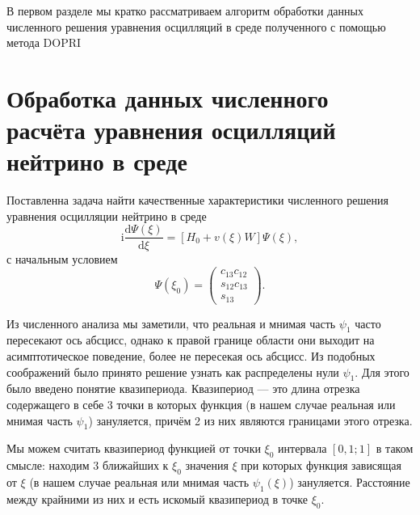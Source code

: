 \documentclass[a4paper,12pt]{article}
\newcommand{\dd}{\mathrm{d}}
\renewcommand{\imath}{\mathrm{i}}
\begin{document}
В первом разделе мы кратко рассматриваем алгоритм обработки данных численного решения уравнения осцилляций в среде полученного с помощью метода DOPRI

	\newpage
	\section{Обработка данных численного расчёта уравнения осцилляций нейтрино в среде}
	Поставленна задача найти качественные характеристики численного решения уравнения осцилляции нейтрино в среде
	\begin{equation}\label{eq:15}
		\imath\frac{\dd\Psi(\xi)}{\dd\xi}=[H_{0}+ v(\xi)W]\Psi(\xi),
	\end{equation}
	с начальным условием
	\begin{equation}\label{eq:19}
		\Psi(\xi_0)=
		\begin{pmatrix}
			c_{13}c_{12}\\
			s_{12}c_{13}\\
			s_{13}
		\end{pmatrix}.
	\end{equation}
	
	 Из численного анализа мы заметили, что реальная и мнимая часть \(\psi_1\) часто пересекают ось абсцисс, однако к правой границе области они выходит на асимптотическое поведение, более не пересекая ось абсцисс. Из подобных соображений было принято решение узнать как распределены нули \(\psi_{1}\). Для этого было введено понятие квазипериода. Квазипериод --- это длина отрезка содержащего в себе 3 точки в которых функция  (в нашем случае реальная или мнимая часть \(\psi_1\)) зануляется, причём 2 из них являются границами этого отрезка.

	Мы можем считать квазипериод функцией от точки \(\xi_0\) интервала \([0,1 ; 1]\) в таком смысле: находим 3 ближайших к \(\xi_0\) значения \(\xi\) при которых функция зависящая от \(\xi\) (в нашем случае реальная или мнимая часть \(\psi_1(\xi)\)) зануляется. Расстояние между крайними из них и есть искомый квазипериод в точке \(\xi_0\).
\end{document}

